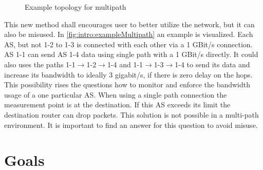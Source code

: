 \documentclass[thesis.tex]{subfiles}
\begin{document}
\begin{figure}[h]
    \centering
    \caption{Example topology for multipath}
    \label{fig:intro:exampleMultipath}
\end{figure}


This new method shall encourages user to better utilize the network, but it can also be misused. In \autoref{fig:intro:exampleMultipath} an example is visualized. Each AS, but not 1-2 to 1-3 is connected with each other via a 1 GBit/s connection. AS 1-1 can send AS 1-4 data using single path with a 1 GBit/s directly. It could also uses the paths 1-1$\rightarrow$1-2$\rightarrow$1-4 and 1-1$\rightarrow$1-3$\rightarrow$1-4 to send its data and increase its bandwidth to ideally 3 gigabit/s, if there is zero delay on the hops. This possibility rises the questions how to monitor and enforce the bandwidth usage of a one particular AS. When using a single path connection the measurement point is at the destination. If this AS exceeds its limit the destination router can drop packets. This solution is not possible in a multi-path environment. It is important to find an answer for this question to avoid misuse.

\section{Goals} \label{sec:intro:goals}
\end{document}

